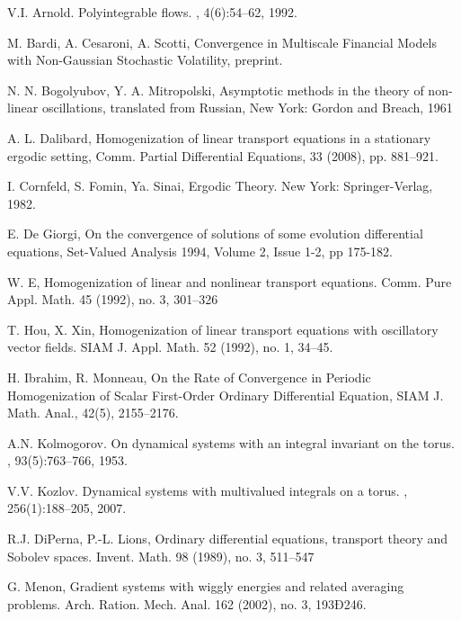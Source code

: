 \documentclass[10pt]{amsart}
\theoremstyle{definition}                                                                                  \newtheorem{remark}[theorem]{Remark}
\theoremstyle{theorem}
\begin{document}
\begin{thebibliography}{1}

V.I. Arnold.
\newblock Polyintegrable flows.
, 4(6):54--62, 1992.

 M. Bardi, A. Cesaroni, A. Scotti,  Convergence in Multiscale Financial Models with Non-Gaussian Stochastic Volatility, preprint.

 N. N. Bogolyubov, 
Y. A. Mitropolski, Asymptotic methods in the theory of non-linear oscillations, translated from Russian, New York: Gordon and Breach, 1961 

A. L. Dalibard, Homogenization of linear transport equations in a stationary ergodic setting, Comm. Partial Differential Equations, 33 (2008), pp. 881--921.

I. Cornfeld, S. Fomin, Ya. Sinai, Ergodic Theory. New York: Springer-Verlag, 1982.

 E. De Giorgi, On the convergence of solutions of some evolution
differential equations,
Set-Valued Analysis
1994, Volume 2, Issue 1-2, pp 175-182.

 W. E, Homogenization of linear and nonlinear transport equations. 
Comm. Pure Appl. Math. 45 (1992), no. 3, 301--326

 T. Hou, X. Xin, Homogenization of linear transport equations with oscillatory vector fields. 
SIAM J. Appl. Math. 52 (1992), no. 1, 34--45.

 H. Ibrahim,  R. Monneau, 
On the Rate of Convergence in Periodic Homogenization of Scalar First-Order Ordinary Differential Equation, 
SIAM J. Math. Anal., 42(5), 2155--2176.

A.N. Kolmogorov.
\newblock On dynamical systems with an integral invariant on the torus.
, 93(5):763--766, 1953.

V.V. Kozlov.
\newblock Dynamical systems with multivalued integrals on a torus.
,
  256(1):188--205, 2007.

 R.J. DiPerna, P.-L. Lions, 
Ordinary differential equations, transport theory and Sobolev spaces. 
Invent. Math. 98 (1989), no. 3, 511--547

 G. Menon,  Gradient systems with wiggly energies and related averaging problems. 
Arch. Ration. Mech. Anal. 162 (2002), no. 3, 193Ð246. 


\end{thebibliography}
\end{document}
